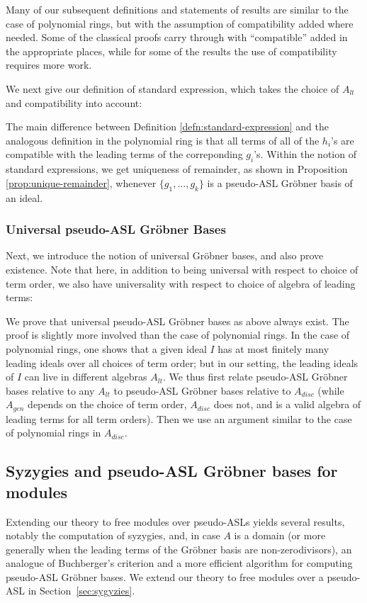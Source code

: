 \documentclass[11pt,reqno]{amsart}
\newcommand{\gb}{Gr\"{o}bner }
\theoremstyle{definition}
\numberwithin{equation}{section}
\begin{document}

Many of our subsequent definitions and statements of results are similar to the case of polynomial rings, but with the assumption of compatibility added where needed. Some of the classical proofs carry through with ``compatible'' added in the appropriate places, while for some of the results the use of compatibility requires more work.

We next give our definition of standard expression, which takes the choice of $A_{lt}$ and compatibility into account:


The main difference between Definition \ref{defn:standard-expression} and the analogous definition in the polynomial ring is that all terms of all of the $h_i$'s are compatible with the leading terms of the correponding $g_i$'s. Within the notion of standard expressions, we get uniqueness of remainder, as shown in Proposition \ref{prop:unique-remainder}, whenever $\{g_1, \ldots, g_k\}$ is a pseudo-ASL \gb basis of an ideal.

\subsubsection{Universal pseudo-ASL \gb Bases}

Next, we introduce the notion of universal \gb bases, and also prove existence. Note that here, in addition to being universal with respect to choice of term order, we also have universality with respect to choice of algebra of leading terms:


We prove that universal pseudo-ASL Gröbner bases as above always exist. The proof is slightly more involved than the case of polynomial rings. In the case of polynomial rings, one shows that a given ideal $I$ has at most finitely many leading ideals over all choices of term order; but in our setting, the leading ideals of $I$ can live in different algebras $A_{lt}$. We thus first relate pseudo-ASL Gröbner bases relative to any $A_{lt}$ to pseudo-ASL Gröbner bases relative to $A_{disc}$ (while $A_{gen}$ depends on the choice of term order, $A_{disc}$ does not, and is a valid algebra of leading terms for all term orders). Then we use an argument similar to the case of polynomial rings in $A_{disc}$.


\subsection{Syzygies and pseudo-ASL \gb bases for modules}
Extending our theory to free modules over pseudo-ASLs yields several results, notably the computation of syzygies, and, in case $A$ is a domain (or more generally when the leading terms of the Gröbner basis are non-zerodivisors), an analogue of Buchberger's criterion and a more efficient algorithm for computing pseudo-ASL Gröbner bases. We extend our theory to free modules over a pseudo-ASL in Section~\ref{sec:sygyzies}.
\end{document}
